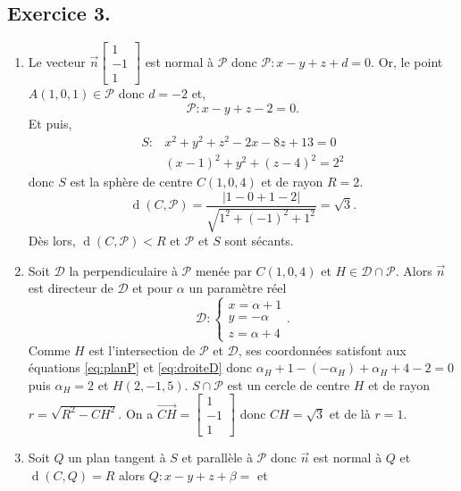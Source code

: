 \documentclass{article}
\DeclareMathOperator{\distan}{d}
\begin{document}
\subsection*{Exercice 3.}
\begin{enumerate}
	\item Le vecteur $\vec{n}\begin{bmatrix}1\\-1\\1\end{bmatrix}$ est normal à $\mathcal{P}$ donc $\mathcal{P}:x-y+z+d=0$. Or, le point $A(1,0,1)\in\mathcal{P}$ donc $d=-2$ et,
		\begin{equation}
			\mathcal{P}:x-y+z-2=0\label{eq:planP}
.\end{equation}
Et puis,
\begin{align}
	S:&x^2+y^2+z^2-2x-8z+13=0\label{eq:sphèreS}\\
	&(x-1)^2+y^2+(z-4)^2=2^2
	\nonumber
\end{align}
donc $S$ est la sphère de centre  $C(1,0,4)$ et de rayon $R=2$.
 \[
	 \distan(C,\mathcal{P})=\frac{\Big|1-0+1-2\Big|}{\sqrt{1^2+(-1)^2+1^2}}=\sqrt{3}
.\]
Dès lors, $\distan(C,\mathcal{P})<R$ et $\mathcal{P}$ et $S$ sont sécants.
\item Soit  $\mathcal{D}$ la perpendiculaire à $\mathcal{P}$ menée par $C(1,0,4)$ et $H\in\mathcal{D}\cap\mathcal{P }$. Alors $ \vec{n}$ est directeur de $\mathcal{D}$ et pour $\alpha$ un paramètre réel
	\begin{equation}
		\mathcal{D}:\begin{cases}
			x=\alpha+1\\
			y=-\alpha\\
			z=\alpha+4
		\end{cases}.\label{eq:droiteD}
	\end{equation}
	Comme $H$ est l'intersection de $\mathcal{P}$ et $\mathcal{D}$, ses coordonnées satisfont aux équations \eqref{eq:planP} et \eqref{eq:droiteD} donc $\alpha_H+1-(-\alpha_H)+\alpha_H+4-2=0$ puis $\alpha_H=2$ et $H(2,-1,5)$. $S\cap\mathcal{P}$ est un cercle de centre $H$ et de rayon $r=\sqrt{R^2-CH^2}$. On a $\overrightarrow{CH}=\begin{bmatrix}1\\-1\\1\end{bmatrix}$ donc $CH=\sqrt{3}$ et de là $r=1$.
\item Soit $Q$ un plan tangent à $S$ et parallèle à $\mathcal{P}$ donc $\vec{n}$ est normal à $Q$ et $\distan(C,Q)=R$ alors $Q:x-y+z+\beta=$ et

\end{enumerate}
\end{document}
